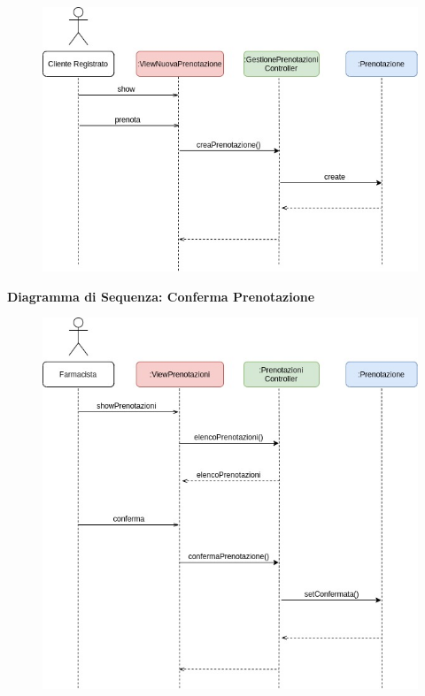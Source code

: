 \begin{figure}[h!]
    \begin{center}
        \includegraphics[scale=0.5]{immagini/Interazione-NuovaPrenotazione.jpg}
    \end{center}
\end{figure}
\hfill \break

\textbf{Diagramma di Sequenza: Conferma Prenotazione}

\begin{figure}[h!]
    \begin{center}
        \includegraphics[scale=0.5]{immagini/Interazione-ConfermaPrenotazione.jpg}
    \end{center}
\end{figure}
\hfill \break

